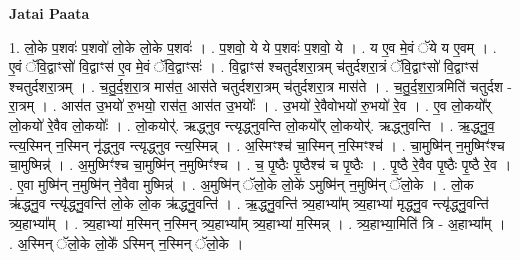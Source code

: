 \documentclass[17pt]{extarticle}
\begin{document}
\textbf{Jatai Paata} \newline

1. लो॒के प॒शवः॑ प॒शवो॑ लो॒के लो॒के प॒शवः॑ । . प॒शवो॒ ये ये प॒शवः॑ प॒शवो॒ ये । . य ए॒व मे॒वं ॅये य ए॒वम् । . ए॒वं ॅवि॒द्वाꣳसो॑ वि॒द्वाꣳस॑ ए॒व मे॒वं ॅवि॒द्वाꣳसः॑ । . वि॒द्वाꣳस॑ श्चतुर्दशरा॒त्रम् च॑तुर्दशरा॒त्रं ॅवि॒द्वाꣳसो॑ वि॒द्वाꣳस॑ श्चतुर्दशरा॒त्रम् । . च॒तु॒र्द॒श॒रा॒त्र मास॑त॒ आस॑ते चतुर्दशरा॒त्रम् च॑तुर्दशरा॒त्र मास॑ते । . च॒तु॒र्द॒श॒रा॒त्रमिति॑ चतुर्दश - रा॒त्रम् । . आस॑त उ॒भयो॑ रु॒भयो॒ रास॑त॒ आस॑त उ॒भयोः᳚ । . उ॒भयो॑ रे॒वैवोभयो॑ रु॒भयो॑ रे॒व । . ए॒व लो॒कयो᳚र् लो॒कयो॑ रे॒वैव लो॒कयोः᳚ । . लो॒कयोर्॑. ऋद्ध्नुव न्त्यृद्ध्नुवन्ति लो॒कयो᳚र् लो॒कयोर्॑. ऋद्ध्नुवन्ति । . ऋ॒द्ध्नु॒व॒ न्त्य॒स्मिन् न॒स्मिन् नृ॑द्ध्नुव न्त्यृद्ध्नुव न्त्य॒स्मिन्न् । . अ॒स्मिꣳश्च॑ चा॒स्मिन् न॒स्मिꣳश्च॑ । . चा॒मुष्मि॑न् न॒मुष्मिꣳ॑श्च चा॒मुष्मिन्न्॑ । . अ॒मुष्मिꣳ॑श्च चा॒मुष्मि॑न् न॒मुष्मिꣳ॑श्च । . च॒ पृ॒ष्ठैः पृ॒ष्ठैश्च॑ च पृ॒ष्ठैः । . पृ॒ष्ठै रे॒वैव पृ॒ष्ठैः पृ॒ष्ठै रे॒व । . ए॒वा मुष्मि॑न् न॒मुष्मि॑न् ने॒वैवा मुष्मिन्न्॑ । . अ॒मुष्मि॑न् ॅलो॒के लो॒के॑ ऽमुष्मि॑न् न॒मुष्मि॑न् ॅलो॒के । . लो॒क ऋ॑द्ध्नु॒व न्त्यृ॑द्ध्नु॒वन्ति॑ लो॒के लो॒क ऋ॑द्ध्नु॒वन्ति॑ । . ऋ॒द्ध्नु॒वन्ति॑ त्र्य॒हाभ्या᳚म् त्र्य॒हाभ्या॑ मृद्ध्नु॒व न्त्यृ॑द्ध्नु॒वन्ति॑ त्र्य॒हाभ्या᳚म् । . त्र्य॒हाभ्या॑ म॒स्मिन् न॒स्मिन् त्र्य॒हाभ्या᳚म् त्र्य॒हाभ्या॑ म॒स्मिन्न् । . त्र्य॒हाभ्या॒मिति॑ त्रि - अ॒हाभ्या᳚म् । . अ॒स्मिन् ॅलो॒के लो॒के᳚ ऽस्मिन् न॒स्मिन् ॅलो॒के । \newline
\end{document}
